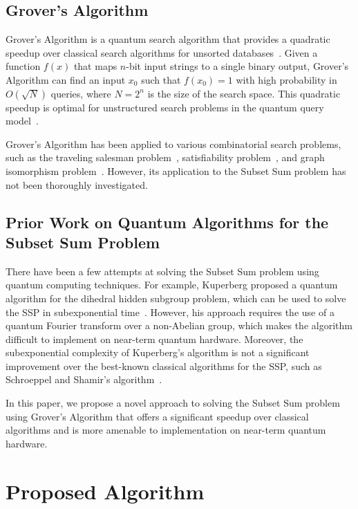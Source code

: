 \subsection{Grover's Algorithm}

Grover's Algorithm is a quantum search algorithm that provides a quadratic speedup over classical search algorithms for unsorted databases~\cite{grover1996fast}. Given a function $f(x)$ that maps $n$-bit input strings to a single binary output, Grover's Algorithm can find an input $x_0$ such that $f(x_0) = 1$ with high probability in $O(\sqrt{N})$ queries, where $N = 2^n$ is the size of the search space. This quadratic speedup is optimal for unstructured search problems in the quantum query model~\cite{bennett1997strengths}.

Grover's Algorithm has been applied to various combinatorial search problems, such as the traveling salesman problem~\cite{durr1996quantum}, satisfiability problem~\cite{cerf1998quantum}, and graph isomorphism problem~\cite{childs2007quantum}. However, its application to the Subset Sum problem has not been thoroughly investigated.

\subsection{Prior Work on Quantum Algorithms for the Subset Sum Problem}

There have been a few attempts at solving the Subset Sum problem using quantum computing techniques. For example, Kuperberg proposed a quantum algorithm for the dihedral hidden subgroup problem, which can be used to solve the SSP in subexponential time~\cite{kuperberg2005subexponential}. However, his approach requires the use of a quantum Fourier transform over a non-Abelian group, which makes the algorithm difficult to implement on near-term quantum hardware. Moreover, the subexponential complexity of Kuperberg's algorithm is not a significant improvement over the best-known classical algorithms for the SSP, such as Schroeppel and Shamir's algorithm~\cite{schroeppel1981fast}.

In this paper, we propose a novel approach to solving the Subset Sum problem using Grover's Algorithm that offers a significant speedup over classical algorithms and is more amenable to implementation on near-term quantum hardware.

\section{Proposed Algorithm}\label{sec:algorithm}

